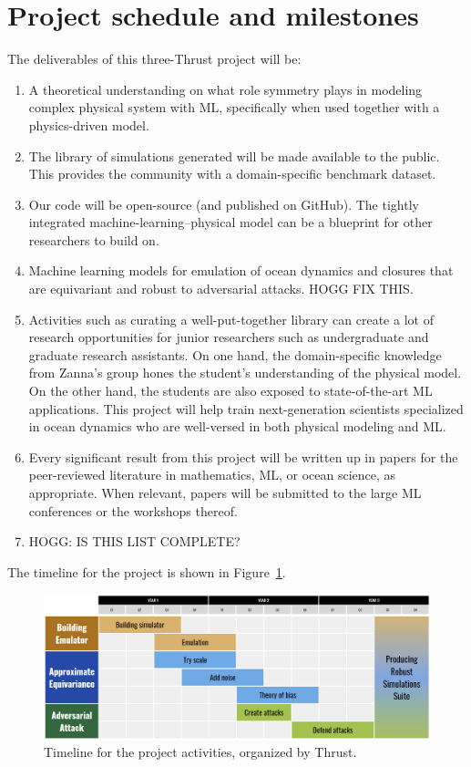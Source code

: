 \documentclass[11pt]{article}
\begin{document}
\section{Project schedule and milestones}\label{sec:deliverables}

The deliverables of this three-Thrust project will be:
\begin{enumerate}
    \item A theoretical understanding on what role symmetry plays in modeling complex physical system with ML, specifically when used together with a physics-driven model.
    \item The library of simulations generated will be made available to the public. This provides the community with a domain-specific benchmark dataset.
    \item Our code will be open-source (and published on GitHub). The tightly integrated machine-learning--physical model can be a blueprint for other researchers to build on.
    \item Machine learning models for emulation of ocean dynamics and closures that are equivariant and robust to adversarial attacks. HOGG FIX THIS.
    \item Activities such as curating a well-put-together library can create a lot of research opportunities for junior researchers such as undergraduate and graduate research assistants. On one hand, the domain-specific knowledge from Zanna's group hones the student's understanding of the physical model. On the other hand, the students are also exposed to state-of-the-art ML applications. This project will help train next-generation scientists specialized in ocean dynamics who are well-versed in both physical modeling and ML.
    \item Every significant result from this project will be written up in papers for the peer-reviewed literature in mathematics, ML, or ocean science, as appropriate. When relevant, papers will be submitted to the large ML conferences or the workshops thereof. 
    \item HOGG: IS THIS LIST COMPLETE? 
\end{enumerate}
The timeline for the project is shown in Figure~\ref{fig:timeline}.

\begin{figure}
    \centering
    \includegraphics[width=0.9\linewidth]{figures/ONR_gnatt_chart.png}
    \caption{Timeline for the project activities, organized by Thrust.}
    \label{fig:timeline}
\end{figure}
\end{document}
